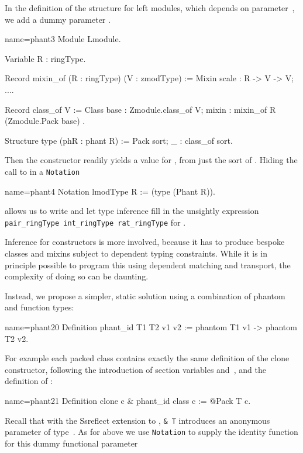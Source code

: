 In the definition of the structure  for left modules, which depends on
 parameter~, we add a dummy  parameter .

\begin{coq}{name=phant3}{}
Module Lmodule.

Variable R : ringType.

Record mixin_of (R : ringType) (V : zmodType) := Mixin {
  scale : R -> V -> V;
  ...}.

Record class_of V := Class {
  base : Zmodule.class_of V;
  mixin : mixin_of R (Zmodule.Pack base)
}.

Structure type (phR : phant R) := Pack {sort; _ : class_of sort}.
\end{coq}

Then the  constructor readily yields a value for ,
from just the sort of . Hiding the call to  in
a \lstinline/Notation/

\begin{coq}{name=phant4}{}
Notation lmodType R := (type (Phant R)).
\end{coq}

allows us to write  and let type inference
fill in the unsightly expression
\lstinline/pair_ringType int_ringType rat_ringType/ for .

Inference for constructors is more involved, because it has to produce
bespoke classes and mixins subject to dependent typing constraints.
While it is in principle possible to program this using dependent
matching and transport, the complexity of doing so can be daunting.

Instead, we propose a simpler, static solution using a combination
of phantom and function types:

\begin{coq}{name=phant20}{}
Definition phant_id T1 T2 v1 v2 := phantom T1 v1 -> phantom T2 v2.
\end{coq}

For example each packed class contains exactly the same definition of
the clone constructor, following the introduction of
section variables  and~, and the definition of :

\begin{coq}{name=phant21}{}
Definition clone c & phant_id class c := @Pack T c.
\end{coq}

Recall that with the {\sc Ssreflect} extension to \Coq{}, \lstinline/& T/
introduces an anonymous parameter of type~. As for 
above we use \lstinline/Notation/ to supply the identity function
for this dummy functional parameter

